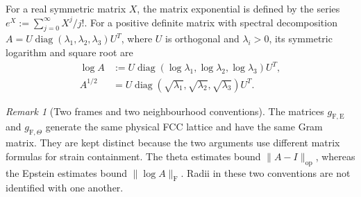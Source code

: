 \documentclass[reqno,english]{amsart}
\theoremstyle{definition}
\newtheorem{open problem}[theorem]{Open Problem}
\theoremstyle{remark}
\newtheorem{remark}[theorem]{Remark}
\theoremstyle{plain}
\numberwithin{equation}{section}
\newcommand{\diag}{\operatorname{diag}}
\newcommand{\gFE}{g_{\mathrm F,\mathrm E}}
\newcommand{\gFT}{g_{\mathrm F,\Theta}}
\begin{document}
For a real symmetric matrix $X$, the matrix exponential is defined by
the series $e^X:=\sum_{j=0}^\infty X^j/j!$. For a positive definite
matrix with spectral decomposition
$A=U\diag(\lambda_1,\lambda_2,\lambda_3)U^T$, where $U$ is orthogonal
and $\lambda_i>0$, its symmetric logarithm and square root are
\[
 \begin{aligned}
  \log A&:=U\diag(\log\lambda_1,\log\lambda_2,\log\lambda_3)U^T,\\
  A^{1/2}&=U\diag(\sqrt{\lambda_1},\sqrt{\lambda_2},\sqrt{\lambda_3})U^T.
 \end{aligned}
\]

\begin{remark}[Two frames and two neighbourhood conventions]
The matrices $\gFE$ and $\gFT$ generate the same physical FCC lattice and
have the same Gram matrix. They are kept distinct because the two arguments use different matrix
formulas for strain containment.
The theta estimates bound $\|A-I\|_{\mathrm{op}}$, whereas the Epstein
estimates bound $\|\log A\|_{\mathrm F}$. Radii in these two conventions are not identified with one another.
\end{remark}
\end{document}
